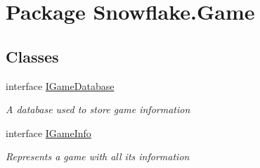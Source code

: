 \hypertarget{namespace_snowflake_1_1_game}{}\section{Package Snowflake.\+Game}
\label{namespace_snowflake_1_1_game}
\subsection*{Classes}
\begin{DoxyCompactItemize}
\item 
interface \hyperlink{interface_snowflake_1_1_game_1_1_i_game_database}{I\+Game\+Database}
\begin{DoxyCompactList}\small\item\em A database used to store game information \end{DoxyCompactList}\item 
interface \hyperlink{interface_snowflake_1_1_game_1_1_i_game_info}{I\+Game\+Info}
\begin{DoxyCompactList}\small\item\em Represents a game with all it\textquotesingle{}s information \end{DoxyCompactList}\end{DoxyCompactItemize}
